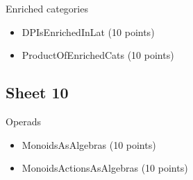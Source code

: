 Enriched categories
\begin{itemize}
	\item DPIsEnrichedInLat (10 points)  
	\item ProductOfEnrichedCats (10 points) 
\end{itemize}

\subsection{Sheet 10}

Operads
\begin{itemize}
	\item MonoidsAsAlgebras (10 points)  
	\item MonoidsActionsAsAlgebras (10 points) 
\end{itemize}

